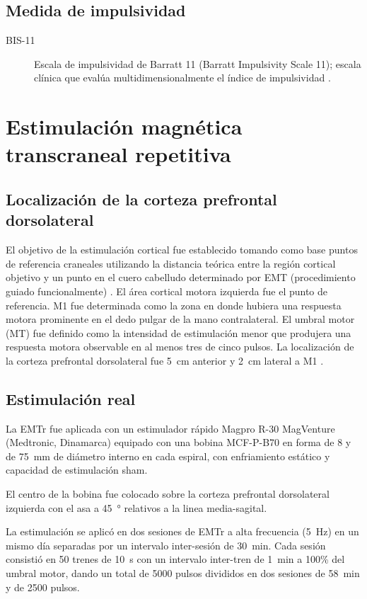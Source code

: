 \subsection{Medida de impulsividad}
\begin{description}
    \item[BIS-11] Escala de impulsividad de Barratt 11 (Barratt Impulsivity Scale 11); escala clínica que evalúa multidimensionalmente el índice de impulsividad \parencite{H.Patton1995,Salvo2013}.
\end{description}

\section{Estimulación magnética transcraneal repetitiva}
\subsection{Localización de la corteza prefrontal dorsolateral}
El objetivo de la estimulación cortical fue establecido tomando como base puntos de referencia craneales utilizando la distancia teórica entre la región cortical objetivo y un punto en el cuero cabelludo determinado por EMT (procedimiento guiado funcionalmente) \parencite{Sparing2008}.
El área cortical motora izquierda fue el punto de referencia.
M1 fue determinada como la zona en donde hubiera una respuesta motora prominente en el dedo pulgar de la mano contralateral.
El umbral motor (MT) fue definido como la intensidad de estimulación menor que produjera una respuesta motora observable en al menos tres de cinco pulsos.
La localización de la corteza prefrontal dorsolateral fue \SI{5}{\centi\meter} anterior y \SI{2}{\centi\meter} lateral a M1 \parencite{Herwig2001a,Varnava2011a}.

\subsection{Estimulación real}
La EMTr fue aplicada con un estimulador rápido Magpro R-30 MagVenture (Medtronic, Dinamarca) equipado con una bobina MCF-P-B70 en forma de 8 y de \SI{75}{\milli\meter} de diámetro interno en cada espiral, con enfriamiento estático y capacidad de estimulación sham. \par
El centro de la bobina fue colocado sobre la corteza prefrontal dorsolateral izquierda con el asa a \SI{45}{\degree} relativos a la linea media-sagital. \par
La estimulación se aplicó en dos sesiones de EMTr a alta frecuencia (\SI{5}{\hertz}) en un mismo día separadas por un intervalo inter-sesión de \SI{30}{\minute}.
Cada sesión consistió en 50 trenes de \SI{10}{\second} con un intervalo inter-tren de \SI{1}{\minute} a 100\% del umbral motor, dando un total de 5000 pulsos divididos en dos sesiones de \SI{58}{\minute} y de 2500 pulsos.

